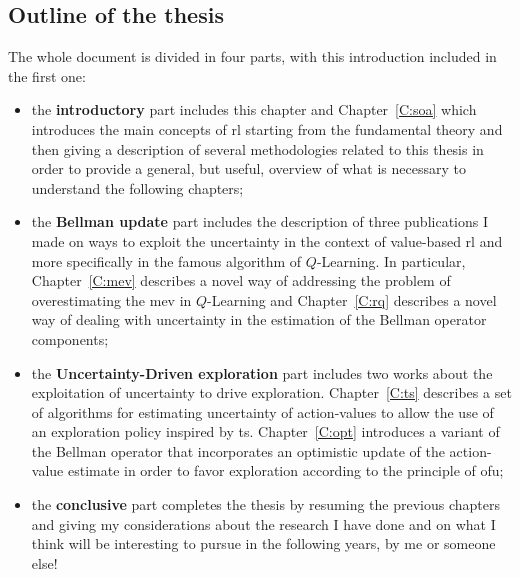 \subsection{Outline of the thesis}
The whole document is divided in four parts, with this introduction included in the first one:
\begin{itemize}
 \item the \textbf{introductory} part includes this chapter and Chapter~\ref{C:soa} which introduces the main concepts of \gls{rl} starting from the fundamental theory and then giving a description of several methodologies related to this thesis in order to provide a general, but useful, overview of what is necessary to understand the following chapters;
 \item the \textbf{Bellman update} part includes the description of three publications I made on ways to exploit the uncertainty in the context of value-based \gls{rl} and more specifically in the famous algorithm of $Q$-Learning. In particular, Chapter~\ref{C:mev} describes a novel way of addressing the problem of overestimating the \gls{mev} in $Q$-Learning and Chapter~\ref{C:rq} describes a novel way of dealing with uncertainty in the estimation of the Bellman operator components;
 \item the \textbf{Uncertainty-Driven exploration} part includes two works about the exploitation of uncertainty to drive exploration. Chapter~\ref{C:ts} describes a set of algorithms for estimating uncertainty of action-values to allow the use of an exploration policy inspired by \gls{ts}. Chapter~\ref{C:opt} introduces a variant of the Bellman operator that incorporates an optimistic update of the action-value estimate in order to favor exploration according to the principle of \gls{ofu};
 \item the \textbf{conclusive} part completes the thesis by resuming the previous chapters and giving my considerations about the research I have done and on what I think will be interesting to pursue in the following years, by me or someone else!
\end{itemize}
